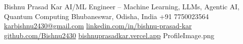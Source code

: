 \documentclass{cv}
\begin{document}
\cvheader
{Bishnu Prasad Kar}
{AI/ML Engineer -- Machine Learning, LLMs, Agentic AI, Quantum Computing}
{Bhubaneswar, Odisha, India \enspace\textbar\enspace +91 7750023564 \enspace\textbar\enspace \href{mailto:karbishnu2430@gmail.com}{karbishnu2430@gmail.com}}
{\href{https://www.linkedin.com/in/bishnu-prasad-kar}{linkedin.com/in/bishnu-prasad-kar} \enspace\textbar\enspace \href{https://github.com/Bishnu2430}{github.com/Bishnu2430} \enspace\textbar\enspace \href{https://bishnuprasadkar.vercel.app}{bishnuprasadkar.vercel.app}}
{ProfileImage.png}










\end{document}

